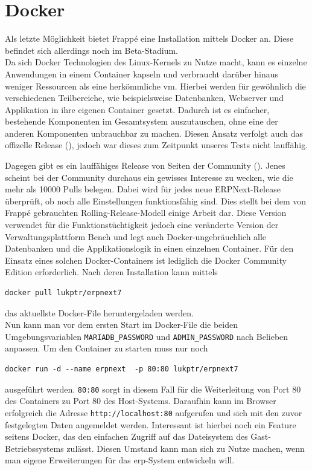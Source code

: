 \section{Docker}
Als letzte Möglichkeit bietet Frappé eine Installation mittels Docker an. Diese befindet sich allerdings noch im Beta-Stadium. \\
Da sich Docker Technologien des Linux-Kernels zu Nutze macht, kann es einzelne Anwendungen in einem Container kapseln und verbraucht darüber hinaus weniger Ressourcen als eine herkömmliche \gls{vm}. 
Hierbei werden für gewöhnlich die verschiedenen Teilbereiche, wie beispielsweise Datenbanken, Webserver und Applikation in ihre eigenen Container gesetzt. Dadurch ist es einfacher, bestehende Komponenten im Gesamtsystem auszutauschen, ohne eine der anderen Komponenten unbrauchbar zu machen. 
Diesen Ansatz verfolgt auch das offizelle Release (\vgl \cite{GhFrappeDocker}), jedoch war dieses zum Zeitpunkt unseres Tests nicht lauffähig.

Dagegen gibt es ein lauffähiges Release von Seiten der Community (\vgl \cite{DockerERPNext}). Jenes scheint bei der Community durchaus ein gewisses Interesse zu wecken, wie die mehr als 10000 Pulls belegen. Dabei wird für jedes neue ERPNext-Release überprüft, ob noch alle Einstellungen funktionsfähig sind. Dies stellt bei dem von Frappé gebrauchten Rolling-Release-Modell einige Arbeit dar. Diese Version verwendet für die Funktionstüchtigkeit jedoch eine veränderte Version der Verwaltungsplattform Bench und legt auch Docker-ungebräuchlich alle Datenbanken und die Applikationslogik in einen einzelnen Container.
Für den Einsatz eines solchen Docker-Containers ist lediglich die Docker Community Edition erforderlich. Nach deren Installation kann mittels 
\begin{verbatim}
docker pull lukptr/erpnext7
\end{verbatim}
das aktuellste Docker-File heruntergeladen werden.\\
Nun kann man vor dem ersten Start im Docker-File die beiden Umgebungsvariablen \texttt{MARIADB\_PASSWORD} und \texttt{ADMIN\_PASSWORD} nach Belieben anpassen.
Um den Container zu starten muss nur noch 
\begin{verbatim}
docker run -d --name erpnext  -p 80:80 lukptr/erpnext7
\end{verbatim}
ausgeführt werden. \texttt{80:80} sorgt in diesem Fall für die Weiterleitung von Port 80 des Containers zu Port 80 des Host-Systems. Daraufhin kann im Browser erfolgreich die Adresse \texttt{http://localhost:80} aufgerufen und sich mit den zuvor festgelegten Daten angemeldet werden.
Interessant ist hierbei noch ein Feature seitens Docker, das den einfachen Zugriff auf das Dateisystem des Gast-Betriebssystems zulässt. Diesen Umstand kann man sich zu Nutze machen, wenn man eigene Erweiterungen für das \gls{erp}-System entwickeln will.

